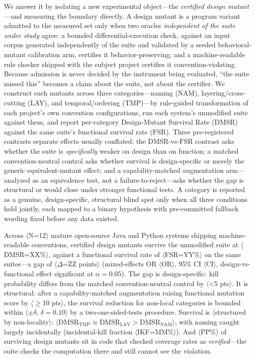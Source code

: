 \documentclass[conference]{IEEEtran}
\newcommand{\ph}[1]{\colorbox{yellow!35}{\small$\langle$\textsf{#1}$\rangle$}}
\newcommand{\dmsr}{\mathrm{DMSR}}
\newcommand{\fsr}{\mathrm{FSR}}
\begin{document}
We answer it by isolating a new experimental object---the \emph{certified design mutant}---and measuring the boundary directly. A design mutant is a program variant admitted to the measured set only when two oracles \emph{independent of the suite under study} agree: a bounded differential-execution check, against an input corpus generated independently of the suite and validated by a seeded behavioral-mutant calibration arm, certifies it behavior-preserving; and a machine-readable rule checker shipped with the subject project certifies it convention-violating. Because admission is never decided by the instrument being evaluated, ``the suite missed this'' becomes a claim about the suite, not about the certifier. We construct such mutants across three categories---naming (NAM), layering/cross-cutting (LAY), and temporal/ordering (TMP)---by rule-guided transformation of each project's own convention configurations, run each system's unmodified suite against them, and report per-category Design-Mutant Survival Rate ($\dmsr$) against the same suite's functional survival rate ($\fsr$). Three pre-registered contrasts separate effects usually conflated: the $\dmsr$-vs-$\fsr$ contrast asks whether the suite is \emph{specifically} weaker on design than on function; a matched convention-neutral control asks whether survival is design-specific or merely the generic equivalent-mutant effect; and a capability-matched augmentation arm---analyzed as an equivalence test, not a failure-to-reject---asks whether the gap is structural or would close under stronger functional tests. A category is reported as a genuine, design-specific, structural blind spot only when all three conditions hold jointly, each mapped to a binary hypothesis with pre-committed fallback wording fixed before any data existed.

Across \ph{N=12} mature open-source Java and Python systems shipping machine-readable conventions, certified design mutants survive the unmodified suite at \ph{DMSR=XX\%}, against a functional survival rate of \ph{FSR=YY\%} on the same suites---a gap of \ph{$\Delta$=ZZ points} (mixed-effects OR \ph{OR}, 95\% CI \ph{CI}, design-vs-functional effect significant at $\alpha{=}0.05$). The gap is design-specific: kill probability differs from the matched convention-neutral control by \ph{<5 pts}. It is structural: after a capability-matched augmentation raising functional mutation score by \ph{$\geq$10 pts}, the survival reduction for non-local categories is bounded within \ph{$\pm\delta$, $\delta{=}0.10$} by a two-one-sided-tests procedure. Survival is \ph{structured by non-locality}: \ph{$\dmsr_{\mathrm{TMP}} \approx \dmsr_{\mathrm{LAY}} > \dmsr_{\mathrm{NAM}}$}, with naming caught largely incidentally (incidental-kill fraction \ph{IKF=MM\%}). And \ph{PP\%} of surviving design mutants sit in code that checked coverage rates as \emph{verified}---the suite checks the computation there and still cannot see the violation.
\end{document}
